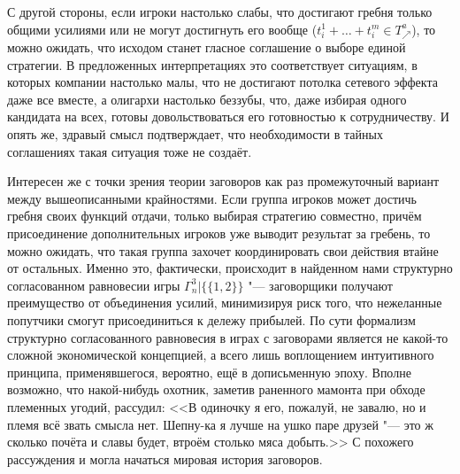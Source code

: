 С другой стороны, если игроки настолько слабы, что достигают гребня только общими усилиями или не могут достигнуть его вообще ($t^1_i + \ldots + t^m_i \in T^a_{\nearrow}$), то можно ожидать, что исходом станет гласное соглашение о выборе единой стратегии. В предложенных интерпретациях это соответствует ситуациям, в которых компании настолько малы, что не достигают потолка сетевого эффекта даже все вместе, а олигархи настолько беззубы, что, даже избирая одного кандидата на всех, готовы довольствоваться его готовностью к сотрудничеству. И опять же, здравый смысл подтверждает, что необходимости в тайных соглашениях такая ситуация тоже не создаёт.

Интересен же с точки зрения теории заговоров как раз промежуточный вариант между вышеописанными крайностями. Если группа игроков может достичь гребня своих функций отдачи, только выбирая стратегию совместно, причём присоединение дополнительных игроков уже выводит результат за гребень, то можно ожидать, что такая группа захочет координировать свои действия втайне от остальных. Именно это, фактически, происходит в найденном нами структурно согласованном равновесии игры $\Gamma^3_n | \{\{1,2\}\}$ "--- заговорщики получают преимущество от объединения усилий, минимизируя риск того, что нежеланные попутчики смогут присоединиться к дележу прибылей. По сути формализм структурно согласованного равновесия в играх с заговорами является не какой-то сложной экономической концепцией, а всего лишь воплощением интуитивного принципа, применявшегося, вероятно, ещё в дописьменную эпоху. Вполне возможно, что накой-нибудь охотник, заметив раненного мамонта при обходе племенных угодий, рассудил: <<В одиночку я его, пожалуй, не завалю, но и племя всё звать смысла нет. Шепну-ка я лучше на ушко паре друзей "--- это ж сколько почёта и славы будет, втроём столько мяса добыть.>> С похожего рассуждения и могла начаться мировая история заговоров.

\FloatBarrier
